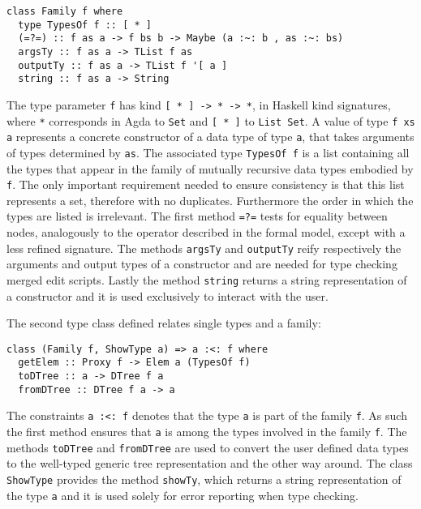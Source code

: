 \documentclass[../Thesis.tex]{subfiles}
\begin{document}
\begin{verbatim}
class Family f where
  type TypesOf f :: [ * ]
  (=?=) :: f as a -> f bs b -> Maybe (a :~: b , as :~: bs) 
  argsTy :: f as a -> TList f as
  outputTy :: f as a -> TList f '[ a ]
  string :: f as a -> String
\end{verbatim}

	The type parameter \texttt{f} has kind \texttt{[ * ] -> * -> *}, in
	Haskell kind signatures, where \texttt{*} corresponds in
	Agda to \texttt{Set} and \texttt{[ * ]} to \texttt{List Set}. 
	A value of type \texttt{f xs a} represents a concrete constructor
	of a data type of type \texttt{a}, that takes arguments of types determined 
	by \texttt{as}.
	The associated type \texttt{TypesOf f} is a list containing all the types
	that appear in the family of mutually recursive data types embodied by
	\texttt{f}. The only important requirement needed to ensure consistency
	is that this list represents a set, therefore with no duplicates. Furthermore
	the order in which the types are listed is irrelevant.
	The first method \texttt{=?=} tests for equality between nodes, analogously
	to the operator described in the formal model, except with a less 
	refined signature.
	The methods \texttt{argsTy} and \texttt{outputTy} reify respectively the
	arguments and output types of a constructor and are needed for
	type checking merged edit scripts.
	Lastly the method \texttt{string} returns a string representation of a
	constructor and it is used exclusively to interact with the user.
	
	The second type class defined relates single types and a family:
\begin{verbatim}
class (Family f, ShowType a) => a :<: f where
  getElem :: Proxy f -> Elem a (TypesOf f)
  toDTree :: a -> DTree f a 
  fromDTree :: DTree f a -> a
\end{verbatim}
	
	The constraints \texttt{a :<: f} denotes that the type \texttt{a} is part
	of the family \texttt{f}.
	As such the first method ensures that \texttt{a} is among the types
	involved in the family \texttt{f}.
	The methods \texttt{toDTree} and \texttt{fromDTree} are used to convert
	the user defined data types to the well-typed generic tree representation
	and the other way around.
	The class \texttt{ShowType} provides the method \texttt{showTy}, which
	returns a string representation of the type \texttt{a} and it is
	used solely for error reporting when type checking. 
	
\end{document}
